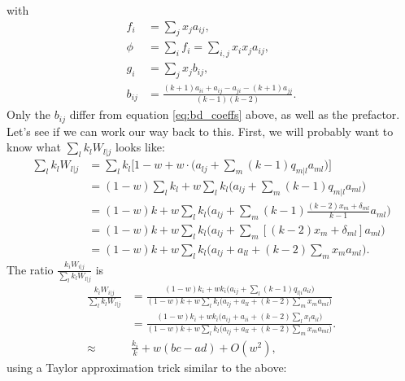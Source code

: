 \documentclass[14pt, justified]{tufte-handout}
\begin{document}
with
\begin{equation}
    \begin{split}
        f_i & = \sum_j x_j a_{ij},
        \\
        \phi & = \sum_i f_i = \sum_{i,j} x_i x_j a_{ij},
        \\
        g_i & = \sum_j x_j b_{ij},
        \\
        b_{ij} & = \frac{(k+1)a_{ii} + a_{ij} - a_{ji} - (k+1)a_{jj}}{(k-1)(k-2)}.
    \end{split}
    \label{eq:db_coeffs}
\end{equation}
Only the $b_{ij}$ differ from equation \ref{eq:bd_coeffs} above, as well as the prefactor.
Let's see if we can work our way back to this.
First, we will probably want to know what $\sum_l k_l W_{l|j}$ looks like:
\begin{equation}
    \begin{split}
        \sum_l k_l W_{l|j} & = \sum_l k_l \Big[ 1 - w + w \cdot \Big( a_{lj} + \sum_m (k-1) q_{m|l} a_{ml} \Big) \Big]
        \\
        & = (1 - w)\sum_l k_l + w \sum_l k_l \Big( a_{lj} + \sum_m (k-1) q_{m|l} a_{ml} \Big)
        \\
        & = (1 - w)k + w \sum_l k_l \Big( a_{lj} + \sum_m (k-1) \frac{(k-2) x_m + \delta_{ml}}{k-1} a_{ml} \Big)
        \\
        & = (1 - w)k + w \sum_l k_l \Big( a_{lj} + \sum_m [(k-2) x_m + \delta_{ml}] a_{ml} \Big)
        \\
        & = (1 - w)k + w \sum_l k_l \Big( a_{lj} + a_{ll} + (k-2) \sum_m x_m a_{ml}  \Big).
    \end{split}
\end{equation}
The ratio $\frac{k_i W_{i|j}}{\sum_l k_l W_{l|j}}$ is
\begin{equation}
    \begin{split}
        \frac{k_i W_{i|j}}{\sum_l k_l W_{l|j}} & = \frac{(1 - w)k_i + w k_i \Big( a_{ij} + \sum_l (k-1) q_{l|i} a_{il} \Big) }{(1 - w)k + w \sum_l k_l \Big( a_{lj} + a_{ll} + (k-2) \sum_m x_m a_{ml} \Big) }
        \\
        & = \frac{(1 - w)k_i + w k_i \Big( a_{ij} + a_{ii} + (k-2) \sum_l x_l a_{il} \Big) }{(1 - w)k + w \sum_l k_l \Big( a_{lj} + a_{ll} + (k-2) \sum_m x_m a_{ml} \Big) }.
        \\
        \approx & \frac{k_i}{k} + w (bc - ad) + O(w^2),
    \end{split}
\end{equation}
using a Taylor approximation trick similar to the above:
\end{document}
